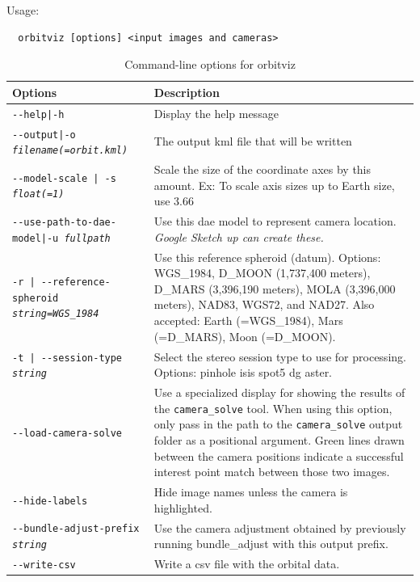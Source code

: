 Usage:
\begin{verbatim}
  orbitviz [options] <input images and cameras> 
\end{verbatim}

\begin{longtable}{|l|p{10cm}|}
\caption{Command-line options for orbitviz}
\label{tbl:orbitviz}
\endfirsthead
\endhead
\endfoot
\endlastfoot
\hline
Options & Description \\ \hline \hline
\texttt{-\/-help|-h} & Display the help message\\ \hline

\texttt{-\/-output|-o \textit{filename(=orbit.kml)}} & The output kml file that will be written \\ \hline

\texttt{-\/-model-scale | -s \textit{float(=1)}} & Scale the size of the coordinate axes by this amount. Ex: To scale axis sizes up to Earth size, use 3.66 \\ \hline

\texttt{-\/-use-path-to-dae-model|-u \textit{fullpath}} & Use this dae model to represent camera location. \emph{Google Sketch up can create these.} \\ \hline

\texttt{-r | -\/-reference-spheroid \textit{string=WGS\_1984}} & Use this reference spheroid (datum). Options: WGS\_1984, D\_MOON (1,737,400 meters), D\_MARS (3,396,190 meters), MOLA (3,396,000 meters), NAD83, WGS72, and NAD27. Also accepted: Earth (=WGS\_1984), Mars (=D\_MARS), Moon (=D\_MOON). \\ \hline

\texttt{-t | -\/-session-type  \textit{string}} & Select the stereo session type to use for processing. Options: pinhole isis spot5 dg aster.\\ \hline

\texttt{-\/-load-camera-solve} & Use a specialized display for showing the results of the \texttt{camera\_solve} tool.
When using this option, only pass in the path to the \texttt{camera\_solve} output folder as a positional argument.
Green lines drawn between the camera positions indicate a successful interest point match between those two images.\\ \hline

\texttt{-\/-hide-labels} & Hide image names unless the camera is highlighted.\\ \hline

\texttt{-\/-bundle-adjust-prefix \textit{string}} & Use the camera adjustment obtained by previously running bundle\_adjust with this output prefix.\\ \hline

\texttt{-\/-write-csv} & Write a csv file with the orbital data.\\ \hline

\end{longtable}

